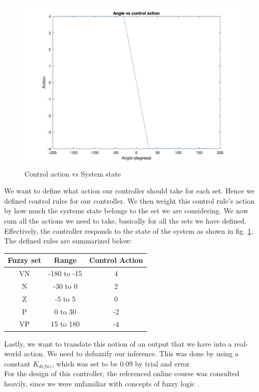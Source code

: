 \begin{figure}[h!]
    \centering
    \includegraphics[scale=0.35]{images/Action.png}
    \caption{ Control action vs System state }
    \label{fig:Action}
\end{figure}

We want to define what action our controller should take for each set. Hence we defined control rules for our controller. We then weight this control rule's action by how much the systems state belongs to the set we are considering. We now sum all the actions we need to take, basically for all the sets we have defined. Effectively, the controller responds to the state of the system as shown in fig. \ref{fig:Action}. \\

The defined rules are summarized below:
\begin{center}
\begin{tabular}{ | c | c | c |}
	\hline
	Fuzzy set & Range		&  Control Action \\
	\hline 
	\hline
	VN 		& -180 to -15	&  4 \\
	\hline
	N		& -30  to 0	&  2 \\  
	\hline
	Z		& -5 to 5		&  0 \\
	\hline
	P		&  0 to  30	& -2 \\
	\hline
	VP		& 15 to 180	& -4 \\
	\hline
\end{tabular}
\end{center}

Lastly, we want to translate this notion of an output that we have into a real-world action. We need to defuzzify our inference. This was done by using a constant $K_{defuz}$, which was set to be 0.09 by trial and error. \\

For the design of this controller, the referenced online course was consulted heavily, since we were unfamiliar with concepts of fuzzy logic \cite{ref1}. 



